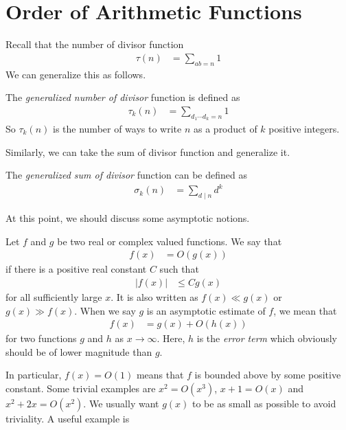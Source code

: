 \documentclass[elemannt.tex]{subfile}
\begin{document}
	\section{Order of Arithmetic Functions}
	Recall that the number of divisor function
		\begin{align*}
			\tau(n)
				&  =\sum_{ab=n}1
		\end{align*}
	We can generalize this as follows.
		\begin{definition}
			The \textit{generalized number of divisor} function is defined as
				\begin{align*}
					\tau_{k}(n)
						& = \sum_{d_{1}\cdots d_{k}=n}1
				\end{align*}
			So $\tau_{k}(n)$ is the number of ways to write $n$ as a product of $k$ positive integers.
		\end{definition}
	Similarly, we can take the sum of divisor function and generalize it.
		\begin{definition}
			The \textit{generalized sum of divisor} function can be defined as
				\begin{align*}
					\sigma_{k}(n)
						& = \sum_{d\mid n}d^{k}
				\end{align*}
		\end{definition}
	At this point, we should discuss some asymptotic notions.
		\begin{definition}[Big O]
			Let $f$ and $g$ be two real or complex valued functions. We say that
				\begin{align*}
					f(x)
					& = O(g(x))
				\end{align*}
			if there is a positive real constant $C$ such that
				\begin{align*}
					|f(x)|
					& \leq Cg(x)
				\end{align*}
			for all sufficiently large $x$. It is also written as $f(x)\ll g(x)$  or $g(x)\gg f(x)$. When we say $g$ is an asymptotic estimate of $f$, we mean that
				\begin{align*}
					f(x)
						& = g(x)+O(h(x))
				\end{align*}
			for two functions $g$ and $h$ as $x\to\infty$. Here, $h$ is the \textit{error term} which obviously should be of lower magnitude than $g$.
		\end{definition}
	In particular, $f(x)=O(1)$ means that $f$ is bounded above by some positive constant. Some trivial examples are $x^{2}=O(x^{3})$, $x+1=O(x)$ and $x^{2}+2x=O(x^{2})$. We usually want $g(x)$ to be as small as possible to avoid triviality. A useful example is
\end{document}
